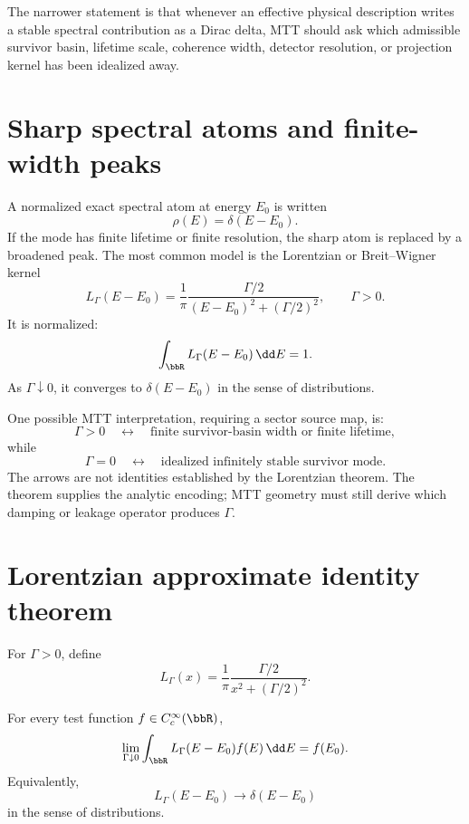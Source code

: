 \documentclass[11pt]{article}
\begin{document}
The narrower statement is that whenever an effective physical description writes a stable spectral contribution as a Dirac delta, MTT should ask which admissible survivor basin, lifetime scale, coherence width, detector resolution, or projection kernel has been idealized away.

\section{Sharp spectral atoms and finite-width peaks}

A normalized exact spectral atom at energy $E_0$ is written
\[
\rho(E)=\delta(E-E_0).
\]
If the mode has finite lifetime or finite resolution, the sharp atom is replaced by a broadened peak. The most common model is the Lorentzian or Breit--Wigner kernel
\[
L_\Gamma(E-E_0)
=
\frac{1}{\pi}\frac{\Gamma/2}{(E-E_0)^2+(\Gamma/2)^2},
\qquad \Gamma>0.
\]
It is normalized:
\[
\int_{\bbR}L_\Gamma(E-E_0)\,\dd E=1.
\]
As $\Gamma\downarrow0$, it converges to $\delta(E-E_0)$ in the sense of distributions.

One possible MTT interpretation, requiring a sector source map, is:
\[
\Gamma>0
\quad\leftrightarrow\quad
\text{finite survivor-basin width or finite lifetime},
\]
while
\[
\Gamma=0
\quad\leftrightarrow\quad
\text{idealized infinitely stable survivor mode}.
\]
The arrows are not identities established by the Lorentzian theorem. The theorem supplies the
analytic encoding; MTT geometry must still derive which damping or leakage operator produces
\(\Gamma\).

\section{Lorentzian approximate identity theorem}

\begin{definition}
For $\Gamma>0$, define
\[
L_\Gamma(x)=\frac{1}{\pi}\frac{\Gamma/2}{x^2+(\Gamma/2)^2}.
\]
\end{definition}

\begin{theorem}
For every test function $f\in C_c^\infty(\bbR)$,
\[
\lim_{\Gamma\downarrow0}\int_{\bbR}L_\Gamma(E-E_0)f(E)\,\dd E=f(E_0).
\]
Equivalently,
\[
L_\Gamma(E-E_0)\to \delta(E-E_0)
\]
in the sense of distributions.
\end{theorem}
\end{document}
